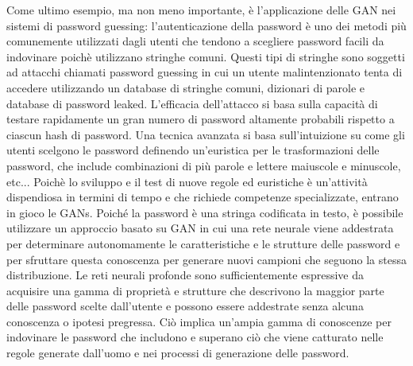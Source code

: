 Come ultimo esempio, ma non meno importante, è l'applicazione delle GAN nei sistemi di password guessing: l'autenticazione della password è uno dei metodi più comunemente utilizzati dagli utenti che tendono a scegliere password facili da indovinare poichè utilizzano stringhe comuni. Questi tipi di stringhe sono soggetti ad attacchi chiamati password guessing in cui un utente malintenzionato tenta di accedere utilizzando un database di stringhe comuni, dizionari di parole e database di password leaked. L'efficacia dell'attacco si basa sulla capacità di testare rapidamente un gran numero di password altamente probabili rispetto a ciascun hash di password. Una tecnica avanzata si basa sull'intuizione su come gli utenti scelgono le password definendo un'euristica per le trasformazioni delle password, che include combinazioni di più parole e lettere maiuscole e minuscole, etc... Poichè lo sviluppo e il test di nuove regole ed euristiche è un'attività dispendiosa in termini di tempo e che richiede competenze specializzate, entrano in gioco le GANs. Poiché la password è una stringa codificata in testo, è possibile utilizzare un approccio basato su GAN in cui una rete neurale viene addestrata per determinare autonomamente le caratteristiche e le strutture delle password e per sfruttare questa conoscenza per generare nuovi campioni che seguono la stessa distribuzione. Le reti neurali profonde sono sufficientemente espressive da acquisire una gamma di proprietà e strutture che descrivono la maggior parte delle password scelte dall'utente e possono essere addestrate senza alcuna conoscenza o ipotesi pregressa. Ciò implica un'ampia gamma di conoscenze per indovinare le password che includono e superano ciò che viene catturato nelle regole generate dall'uomo e nei processi di generazione delle password.